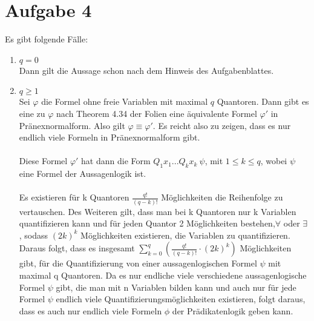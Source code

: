 \documentclass[a4paper,10pt]{article}
\begin{document}
\section*{Aufgabe 4}
Es gibt folgende Fälle:
\begin{enumerate}
\item{$q = 0$}\\
Dann gilt die Aussage schon nach dem Hinweis des Aufgabenblattes.
\item{$q \ge 1$}\\
Sei $\varphi$ die Formel ohne freie Variablen mit maximal $q$ Quantoren. Dann gibt es eine zu $\varphi$ nach Theorem 4.34 der Folien eine äquivalente Formel $\varphi'$ in Pränexnormalform. Also gilt $\varphi \equiv \varphi'$. Es reicht also zu zeigen, dass es nur endlich viele Formeln in Pränexnormalform gibt.
\\\\
Diese Formel $\varphi'$ hat dann die Form $Q_1x_1...Q_kx_k\ \psi$, mit $1 \le k \le q$, wobei $\psi$ eine Formel der Aussagenlogik ist.
\\\\
Es existieren für k Quantoren $\frac{q!}{(q - k)!}$ Möglichkeiten die Reihenfolge zu vertauschen.  Des Weiteren gilt, dass man bei k Quantoren nur k Variablen quantifizieren kann und für jeden Quantor 2 Möglichkeiten bestehen,$\forall$ oder $\exists$, sodass $(2k)^k$ Möglichkeiten existieren, die Variablen zu quantifizieren. Daraus folgt, dass es insgesamt $\sum\limits_{k=0}^q (\frac{q!}{(q - k)!} \cdot (2k)^k)$ Möglichkeiten gibt, für die Quantifizierung von einer aussagenlogischen Formel $\psi$ mit maximal q Quantoren. Da es nur endliche viele verschiedene aussagenlogische Formel $\psi$ gibt, die man mit n Variablen bilden kann und auch nur für jede Formel $\psi$ endlich viele Quantifizierungsmöglichkeiten existieren, folgt daraus, dass es auch nur endlich viele Formeln $\phi$ der Prädikatenlogik geben kann.
\end{enumerate}
\end{document}
